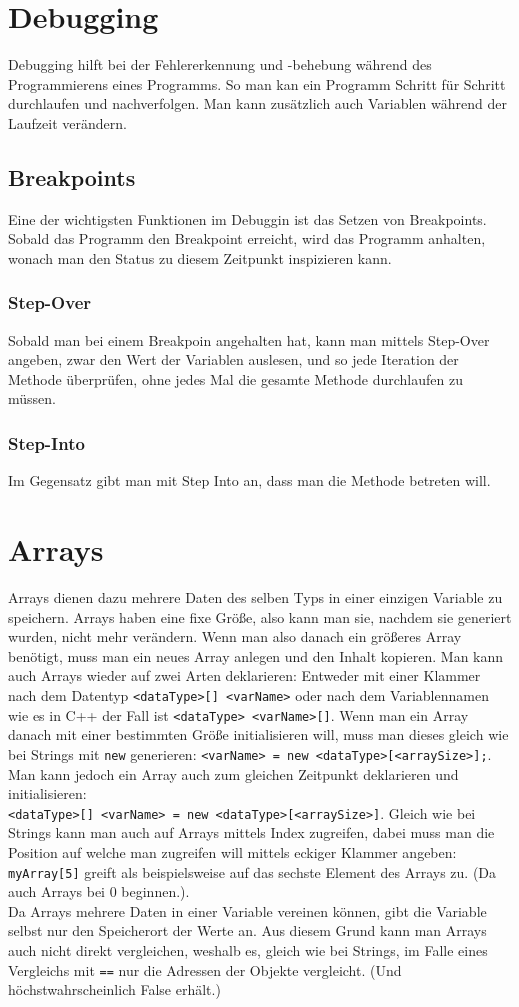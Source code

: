 \documentclass{article}
\begin{document}
	\section{Debugging}
	Debugging hilft bei der Fehlererkennung und -behebung während des Programmierens eines Programms. So man kan ein Programm Schritt für Schritt durchlaufen und nachverfolgen. Man kann zusätzlich auch Variablen während der Laufzeit verändern. \\
	\subsection{Breakpoints}
	Eine der wichtigsten Funktionen im Debuggin ist das Setzen von Breakpoints. Sobald das Programm den Breakpoint erreicht, wird das Programm anhalten, wonach man den Status zu diesem Zeitpunkt inspizieren kann.
	\subsubsection{Step-Over}
	Sobald man bei einem Breakpoin angehalten hat, kann man mittels Step-Over angeben, zwar den Wert der Variablen auslesen, und so jede Iteration der Methode überprüfen, ohne jedes Mal die gesamte Methode durchlaufen zu müssen.
	\subsubsection{Step-Into}
	Im Gegensatz gibt man mit Step Into an, dass man die Methode betreten will.
	\section{Arrays}
	Arrays dienen dazu mehrere Daten des selben Typs in einer einzigen Variable zu speichern. Arrays haben eine fixe Größe, also kann man sie, nachdem sie generiert wurden, nicht mehr verändern. Wenn man also danach ein größeres Array benötigt, muss man ein neues Array anlegen und den Inhalt kopieren. Man kann auch Arrays wieder auf zwei Arten deklarieren: Entweder mit einer Klammer nach dem Datentyp \verb|<dataType>[] <varName>| oder nach dem Variablennamen wie es in C++ der Fall ist \verb|<dataType> <varName>[]|. Wenn man ein Array danach mit einer bestimmten Größe initialisieren will, muss man dieses gleich wie bei Strings mit \verb|new| generieren: \verb|<varName> = new <dataType>[<arraySize>];|.\\
	Man kann jedoch ein Array auch zum gleichen Zeitpunkt deklarieren und initialisieren: \\ \verb|<dataType>[] <varName> = new <dataType>[<arraySize>]|.
	Gleich wie bei Strings kann man auch auf Arrays mittels Index zugreifen, dabei muss man die Position auf welche man zugreifen will mittels eckiger Klammer angeben: \verb|myArray[5]| greift als beispielsweise auf das sechste Element des Arrays zu. (Da auch Arrays bei 0 beginnen.). \\
	Da Arrays mehrere Daten in einer Variable vereinen können, gibt die Variable selbst nur den Speicherort der Werte an. Aus diesem Grund kann man Arrays auch nicht direkt vergleichen, weshalb es, gleich wie bei Strings, im Falle eines Vergleichs mit \verb|==| nur die Adressen der Objekte vergleicht. (Und höchstwahrscheinlich False erhält.) \\
\end{document}
